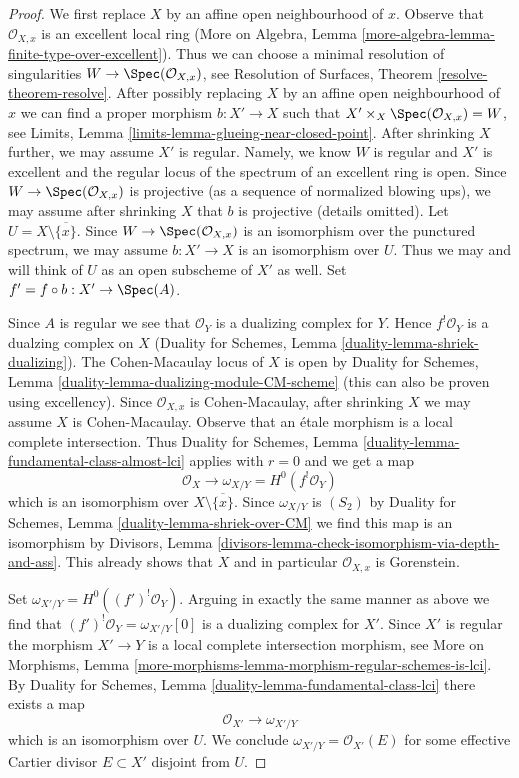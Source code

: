 \begin{proof}

We first replace $X$ by an affine open neighbourhood of $x$.
Observe that $\mathcal{O}_{X, x}$ is an excellent local ring
(More on Algebra, Lemma \ref{more-algebra-lemma-finite-type-over-excellent}).
Thus we can choose a minimal resolution of singularities
$W \to \Spec(\mathcal{O}_{X, x})$, see
Resolution of Surfaces, Theorem \ref{resolve-theorem-resolve}.
After possibly replacing $X$ by an affine open neighbourhood of $x$
we can find a proper morphism $b : X' \to X$ such that
$X' \times_X \Spec(\mathcal{O}_{X, x}) = W$, see
Limits, Lemma \ref{limits-lemma-glueing-near-closed-point}.
After shrinking $X$ further, we may assume $X'$ is regular.
Namely, we know $W$ is regular and $X'$ is excellent
and the regular locus of the spectrum of an excellent ring is open.
Since $W \to \Spec(\mathcal{O}_{X, x})$ is projective
(as a sequence of normalized blowing ups), we may assume
after shrinking $X$ that $b$ is projective (details omitted).
Let $U = X \setminus \overline{\{x\}}$.
Since $W \to \Spec(\mathcal{O}_{X, x})$ is an isomorphism over the
punctured spectrum, we may assume $b : X' \to X$ is an isomorphism over $U$.
Thus we may and will think of $U$ as an open subscheme of $X'$ as well.
Set $f' = f \circ b : X' \to \Spec(A)$.

\medskip\noindent
Since $A$ is regular we see that $\mathcal{O}_Y$ is a dualizing complex for $Y$.
Hence $f^!\mathcal{O}_Y$ is a dualzing complex on $X$
(Duality for Schemes, Lemma \ref{duality-lemma-shriek-dualizing}).
The Cohen-Macaulay locus of $X$ is open by
Duality for Schemes, Lemma \ref{duality-lemma-dualizing-module-CM-scheme}
(this can also be proven using excellency).
Since $\mathcal{O}_{X, x}$ is Cohen-Macaulay, after shrinking
$X$ we may assume $X$ is Cohen-Macaulay.
Observe that an \'etale morphism is a local complete intersection.
Thus
Duality for Schemes, Lemma \ref{duality-lemma-fundamental-class-almost-lci}
applies with $r = 0$ and we get a map
$$
\mathcal{O}_X \longrightarrow \omega_{X/Y} = H^0(f^!\mathcal{O}_Y)
$$
which is an isomorphism over $X \setminus \overline{\{x\}}$.
Since $\omega_{X/Y}$ is $(S_2)$ by
Duality for Schemes, Lemma \ref{duality-lemma-shriek-over-CM}
we find this map is an isomorphism by
Divisors, Lemma \ref{divisors-lemma-check-isomorphism-via-depth-and-ass}.
This already shows that $X$ and in particular $\mathcal{O}_{X, x}$ is
Gorenstein.

\medskip\noindent
Set $\omega_{X'/Y} = H^0((f')^!\mathcal{O}_Y)$. Arguing in exactly the
same manner as above we find that $(f')^!\mathcal{O}_Y = \omega_{X'/Y}[0]$
is a dualizing complex for $X'$. Since $X'$ is regular
the morphism $X' \to Y$ is a local complete intersection morphism, see
More on Morphisms, Lemma
\ref{more-morphisms-lemma-morphism-regular-schemes-is-lci}.
By Duality for Schemes, Lemma \ref{duality-lemma-fundamental-class-lci}
there exists a map
$$
\mathcal{O}_{X'} \longrightarrow \omega_{X'/Y}
$$
which is an isomorphism over $U$. We conclude
$\omega_{X'/Y} = \mathcal{O}_{X'}(E)$ for some effective
Cartier divisor $E \subset X'$ disjoint from $U$.


\end{proof}
